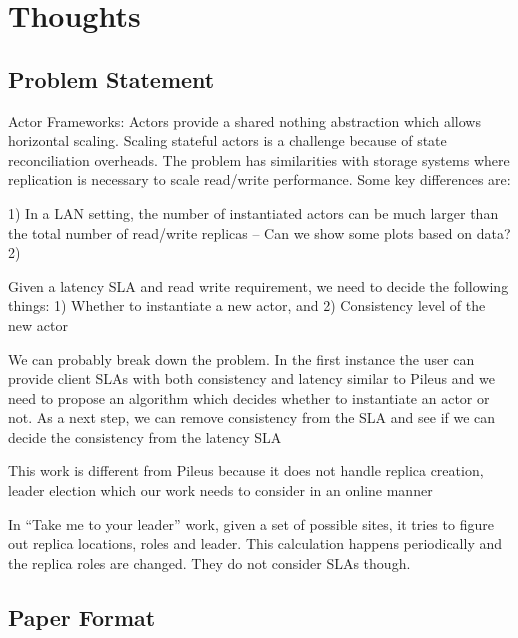 \section{Thoughts}
\label{sec:intro}

\subsection{Problem Statement}

Actor Frameworks: Actors provide a shared nothing abstraction which allows horizontal scaling. Scaling stateful actors is a challenge because of state reconciliation overheads. The problem has similarities with storage systems where replication is necessary to scale read/write performance. Some key differences are:

1) In a LAN setting, the number of instantiated actors can be much larger than the total number of read/write replicas -- Can we show some plots based on data?
2) 

Given a latency SLA and read write requirement, we need to decide the following things: 1) Whether to instantiate a new actor, and 2) Consistency level of the new actor

We can probably break down the problem. In the first instance the user can provide client SLAs with both consistency and latency similar to Pileus and we need to propose an algorithm which decides whether to instantiate an actor or not. As a next step, we can remove consistency from the SLA and see if we can decide the consistency from the latency SLA

This work is different from Pileus because it does not handle replica creation, leader election which our work needs to consider in an online manner

In ``Take me to your leader'' work, given a set of possible sites, it tries to figure out replica locations, roles and leader. This calculation happens periodically and the replica roles are changed. They do not consider SLAs though.

\subsection{Paper Format}
